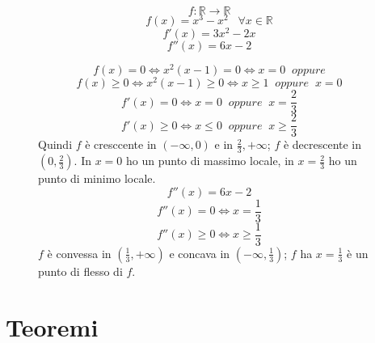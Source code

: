 \documentclass[a4paper]{article}
\theoremstyle{break}
\theoremstyle{break}
\theoremstyle{break}
\theoremstyle{break}
\begin{document}
\begin{figure}[H]
  \begin{example}
    \[
      f: \mathbb{R}\to \mathbb{R}
    \] 
    \[
      f(x) = x^3-x^2\;\;\; \forall x \in \mathbb{R}
    \] 
    \[
      f'(x) = 3x^2-2x
    \] 
    \[
      f''(x) = 6x-2
    \] 
    \begin{figure}[H]
      \begin{center}
      \end{center}
    \end{figure}


    \[
      f(x) = 0 \Leftrightarrow x^2(x-1) = 0 \Leftrightarrow x = 0\;\; oppure
    \] 
    \[
      f(x) \ge 0 \Leftrightarrow x^2(x-1) \ge 0 \Leftrightarrow x \ge 1\;\; oppure\;\; x = 0
    \] 
    \[
      f'(x) = 0 \Leftrightarrow x=0 \;\; oppure\;\; x=\frac{2}{3}
    \] 
    \[
      f'(x) \ge 0 \Leftrightarrow x \le 0 \;\;oppure\;\; x \ge \frac{2}{3}
    \] 
    Quindi \( f \) è cresccente in \( (-\infty, 0) \) e in \( \frac{2}{3}, +\infty \); \( f \) 
    è decrescente in \( (0, \frac{2}{3}) \). In \( x=0 \) ho un punto di massimo locale,
    in \( x=\frac{2}{3} \) ho un punto di minimo locale.
    \[
      f''(x) = 6x-2
    \] 
    \[
      f''(x) = 0 \Leftrightarrow x = \frac{1}{3}
    \] 
    \[
      f''(x) \ge 0 \Leftrightarrow x \ge \frac{1}{3}
    \] 
    \( f \) è convessa in \( (\frac{1}{3}, +\infty) \) e concava in \( (-\infty, \frac{1}{3}) \);
    \( f \) ha \( x = \frac{1}{3} \) è un punto di flesso di \( f \).
  \end{example}
\end{figure}

\section{Teoremi}
\end{document}
